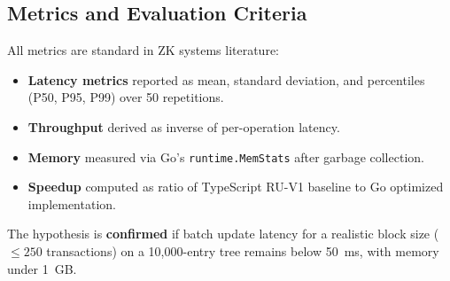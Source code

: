 \subsection{Metrics and Evaluation Criteria}

All metrics are standard in ZK systems literature:

\begin{itemize}
  \item \textbf{Latency metrics} reported as mean, standard
    deviation, and percentiles (P50, P95, P99) over 50 repetitions.
  \item \textbf{Throughput} derived as inverse of per-operation
    latency.
  \item \textbf{Memory} measured via Go's \texttt{runtime.MemStats}
    after garbage collection.
  \item \textbf{Speedup} computed as ratio of TypeScript RU-V1
    baseline to Go optimized implementation.
\end{itemize}

The hypothesis is \textbf{confirmed} if batch update latency for
a realistic block size ($\leq 250$ transactions) on a 10,000-entry
tree remains below 50~ms, with memory under 1~GB.
